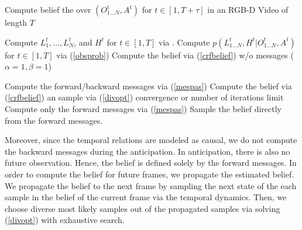 \setlength{\textfloatsep}{0.1pt}
\begin{algorithm}
\caption{Compute belief the over $(O^t_{1\ldots N},A^t)$ for \mbox{$t \in [1,T+\tau]$} in an RGB-D Video of length $T$}
\label{alg:recursive}
\begin{algorithmic}
\STATE Compute $L^t_1,\ldots,L^t_N$, and $H^t$ for $t \in [1,T]$ via \cite{hemaIJRR}.
\STATE Compute $p(L^t_{1\ldots N},H^t|O^t_{1\ldots N},A^t)$ for $t \in [1,T]$ via (\ref{obsprob})
\STATE Compute the belief via (\ref{crfbelief}) w/o messages ($\alpha=1,\beta=1$)
\end{algorithmic}
\begin{algorithmic}
\REPEAT
{}
\STATE Compute the forward/backward messages via (\ref{mespas})
\STATE Compute the belief via (\ref{crfbelief}) an sample via (\ref{divopt})
\ENDFOR
\UNTIL convergence or number of iterations limit
\STATE Compute only the forward messages via (\ref{mespas})
\STATE Sample the belief directly from the forward messages.
\ENDFOR
\end{algorithmic}
\end{algorithm}


Moreover, since the temporal relations are modeled as causal, we do not compute the backward messages during the anticipation. In anticipation, there is also no future observation. Hence, the belief is defined solely by the forward messages. In order to compute the belief for future frames, we propagate the estimated belief. We propagate the belief to the next frame by sampling the next state of the each sample in the belief of the current frame via the temporal dynamics. Then, we choose diverse most likely samples out of the propagated samples via solving (\ref{divopt}) with exhaustive search.
